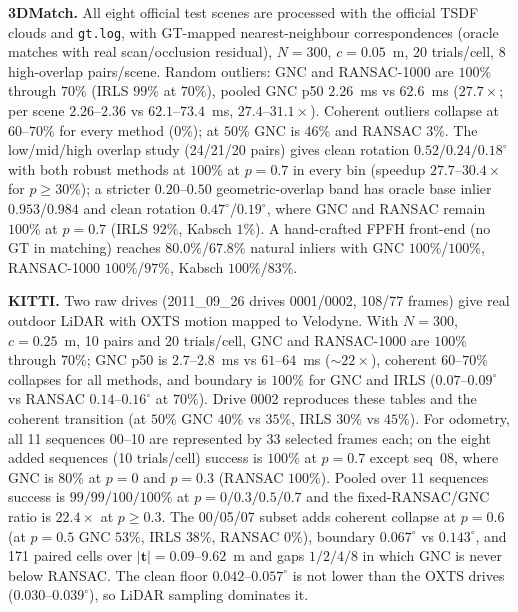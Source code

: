 \noindent\textbf{3DMatch.} All eight official test scenes are processed with the official TSDF
clouds and \texttt{gt.log}, with GT-mapped nearest-neighbour correspondences (oracle matches with
real scan/occlusion residual), $N=300$, $c=0.05$~m, 20 trials/cell, 8 high-overlap pairs/scene.
Random outliers: GNC and RANSAC-1000 are $100\%$ through $70\%$ (IRLS $99\%$ at $70\%$), pooled GNC
p50 $2.26$~ms vs $62.6$~ms ($27.7\times$; per scene $2.26$--$2.36$ vs $62.1$--$73.4$~ms,
$27.4$--$31.1\times$). Coherent outliers collapse at $60$--$70\%$ for every method ($0\%$); at
$50\%$ GNC is $46\%$ and RANSAC $3\%$. The low/mid/high overlap study (24/21/20 pairs) gives clean
rotation $0.52/0.24/0.18^\circ$ with both robust methods at $100\%$ at $p=0.7$ in every bin
(speedup $27.7$--$30.4\times$ for $p\ge30\%$); a stricter $0.20$--$0.50$ geometric-overlap band has
oracle base inlier $0.953$/$0.984$ and clean rotation $0.47^\circ$/$0.19^\circ$, where GNC and
RANSAC remain $100\%$ at $p=0.7$ (IRLS $92\%$, Kabsch $1\%$). A hand-crafted FPFH front-end (no GT
in matching) reaches $80.0\%$/$67.8\%$ natural inliers with GNC $100\%$/$100\%$, RANSAC-1000
$100\%$/$97\%$, Kabsch $100\%$/$83\%$.

\noindent\textbf{KITTI.} Two raw drives (2011\_09\_26 drives 0001/0002, 108/77 frames) give real
outdoor LiDAR with OXTS motion mapped to Velodyne. With $N=300$, $c=0.25$~m, 10 pairs and
20 trials/cell, GNC and RANSAC-1000 are $100\%$ through $70\%$; GNC p50 is $2.7$--$2.8$~ms vs
$61$--$64$~ms ($\sim22\times$), coherent $60$--$70\%$ collapses for all methods, and boundary is
$100\%$ for GNC and IRLS ($0.07$--$0.09^\circ$ vs RANSAC $0.14$--$0.16^\circ$ at $70\%$). Drive 0002
reproduces these tables and the coherent transition (at $50\%$ GNC $40\%$ vs $35\%$, IRLS $30\%$ vs
$45\%$). For odometry, all 11 sequences 00--10 are represented by 33 selected frames each; on the
eight added sequences (10 trials/cell) success is $100\%$ at $p=0.7$ except seq~08, where GNC is
$80\%$ at $p=0$ and $p=0.3$ (RANSAC $100\%$). Pooled over 11 sequences success is
$99/99/100/100\%$ at $p=0/0.3/0.5/0.7$ and the fixed-RANSAC/GNC ratio is $22.4\times$ at $p\ge0.3$.
The 00/05/07 subset adds coherent collapse at $p=0.6$ (at $p=0.5$ GNC $53\%$, IRLS $38\%$, RANSAC
$0\%$), boundary $0.067^\circ$ vs $0.143^\circ$, and 171 paired cells over $|\mathbf{t}|=0.09$--$9.62$~m
and gaps $1/2/4/8$ in which GNC is never below RANSAC. The clean floor $0.042$--$0.057^\circ$ is not
lower than the OXTS drives ($0.030$--$0.039^\circ$), so LiDAR sampling dominates it.

